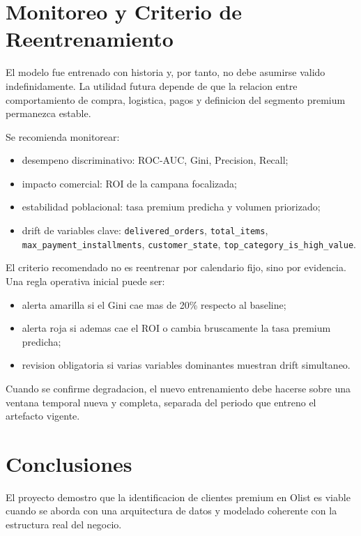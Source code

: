\documentclass[12pt,letterpaper]{article}
\begin{document}
\section{Monitoreo y Criterio de Reentrenamiento}
El modelo fue entrenado con historia y, por tanto, no debe asumirse valido indefinidamente. La utilidad futura depende de que la relacion entre comportamiento de compra, logistica, pagos y definicion del segmento premium permanezca estable.

Se recomienda monitorear:
\begin{itemize}
    \item desempeno discriminativo: ROC-AUC, Gini, Precision, Recall;
    \item impacto comercial: ROI de la campana focalizada;
    \item estabilidad poblacional: tasa premium predicha y volumen priorizado;
    \item drift de variables clave: \texttt{delivered\_orders}, \texttt{total\_items}, \texttt{max\_payment\_installments}, \texttt{customer\_state}, \texttt{top\_category\_is\_high\_value}.
\end{itemize}

El criterio recomendado no es reentrenar por calendario fijo, sino por evidencia. Una regla operativa inicial puede ser:
\begin{itemize}
    \item alerta amarilla si el Gini cae mas de 20\% respecto al baseline;
    \item alerta roja si ademas cae el ROI o cambia bruscamente la tasa premium predicha;
    \item revision obligatoria si varias variables dominantes muestran drift simultaneo.
\end{itemize}

Cuando se confirme degradacion, el nuevo entrenamiento debe hacerse sobre una ventana temporal nueva y completa, separada del periodo que entreno el artefacto vigente.

\section{Conclusiones}
El proyecto demostro que la identificacion de clientes premium en Olist es viable cuando se aborda con una arquitectura de datos y modelado coherente con la estructura real del negocio.
\end{document}
